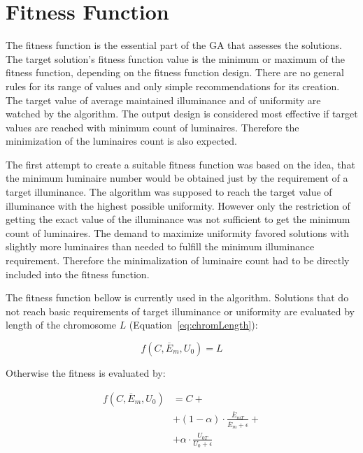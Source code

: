 \section{Fitness Function}
The fitness function is the essential part of the GA that assesses the solutions. The target solution's fitness function value is the minimum or maximum of the fitness function, depending on the fitness function design. There are no general rules for its range of values and only simple recommendations for its creation. The target value of average maintained illuminance and of uniformity are watched by the algorithm. The output design is considered most effective if target values are reached with minimum count of luminaires. Therefore the minimization of the luminaires count is also expected.

The first attempt to create a suitable fitness function was based on the idea, that the minimum luminaire number would be obtained just by the requirement of a target illuminance. The algorithm was supposed to reach the target value of illuminance with the highest possible uniformity. However only the restriction of getting the exact value of the illuminance was not sufficient to get the minimum count of luminaires. The demand to maximize uniformity favored solutions with slightly more luminaires than needed to fulfill the minimum illuminance requirement. Therefore the minimalization of luminaire count had to be directly included into the fitness function.

The fitness function bellow is currently used in the algorithm. Solutions that do not reach basic requirements of target illuminance or uniformity are evaluated by length of the chromosome $L$ (Equation~\ref{eq:chromLength}):

\begin{equation}
\label{eq:fitV2EUA}
	f\left(C,\overline{E}_{m}, U_0\right)= L
\end{equation}

\noindent Otherwise the fitness is evaluated by:

\begin{equation}
\label{eq:fitV2EUB}
\begin{split}
f\left(C, \overline{E}_{m}, U_0\right)&=C +\\
& + \left( 1 - \alpha\right)\cdot\frac{\overline{E}_{mT}}{\overline{E}_{m}+\epsilon} + \\
& + \alpha\cdot\frac{U_{0T}}{U_0 + \epsilon}
\end{split}
\end{equation}

